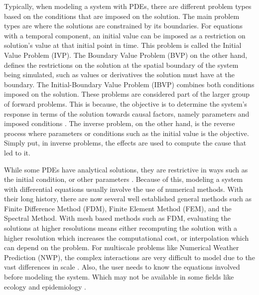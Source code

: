 \documentclass[preprint,12pt,times,authoryear]{elsarticle}
\begin{document}
Typically, when modeling a system with PDEs, there are different problem types based on the conditions that are imposed on the solution. The main problem types are where the solutions are constrained by its boundaries. For equations with a temporal component, an initial value can be imposed as a restriction on solution's value at that initial point in time. This problem is called the Initial Value Problem (IVP). The Boundary Value Problem (BVP) on the other hand, defines the restrictions on the solution at the spatial boundary of the system being simulated, such as values or derivatives the solution must have at the boundary. The Initial-Boundary Value Problem (IBVP) combines both conditions imposed on the solution. These problems are considered part of the larger group of forward problems. This is because, the objective is to determine the system's response in terms of the solution towards causal factors, namely parameters and imposed conditions \citep{groetschInverseProblemsMathematical1993, vogelComputationalMethodsInverse2002}. The inverse problem, on the other hand, is the reverse process where parameters or conditions such as the initial value is the objective. Simply put, in inverse problems, the effects are used to compute the cause that led to it.

While some PDEs have analytical solutions, they are restrictive in ways such as the initial condition, or other parameters \citep{selvaduraiPartialDifferentialEquations2000,koprivaImplementingSpectralMethods2009, olverIntroductionPartialDifferential2014, schiesserNumericalMethodLines2012, wazwazPartialDifferentialEquations2010}. Because of this, modeling a system with differential equations usually involve the use of numerical methods. With their long history, there are now several well established general methods such as Finite Difference Method (FDM), Finite Element Method (FEM), and the Spectral Method. With mesh based methods such as FDM, evaluating the solutions at higher resolutions means either recomputing the solution with a higher resolution which increases the computational cost, or interpolation which can depend on the problem. For multiscale problems like Numerical Weather Prediction (NWP), the complex interactions are very difficult to model due to the vast differences in scale \citep{frankCharacterizingDynamicsMultiscale2024}. Also, the user needs to know the equations involved before modeling the system. Which may not be available in some fields like ecology \citep{holmesPartialDifferentialEquations1994,turchinDoesPopulationEcology2001} and epidemiology \citep{brauerMathematicalModelsEpidemiology2019}.
\end{document}
